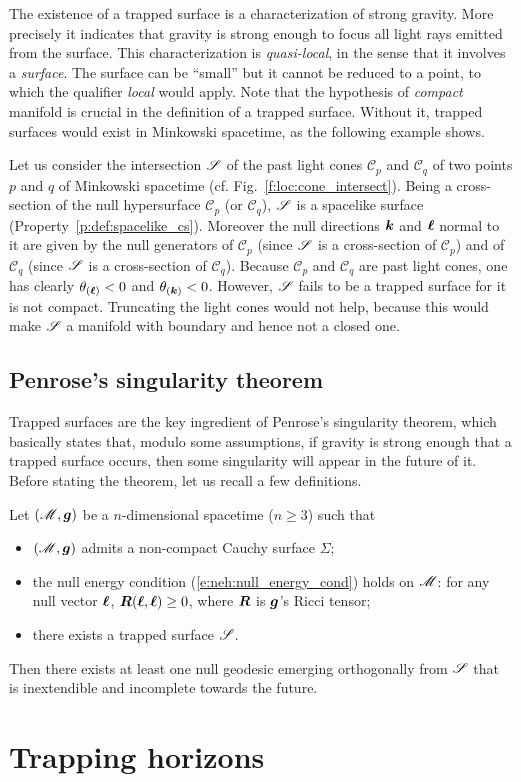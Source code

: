 The existence of a trapped surface is a characterization of
strong gravity. More precisely it indicates that gravity is strong enough
to focus all light rays emitted from the surface.
This characterization is \emph{quasi-local}, in the sense that it involves a \emph{surface}. The
surface can be ``small'' but it cannot be reduced to a point, to which the qualifier \emph{local}
would apply. Note that the hypothesis of \emph{compact} manifold is crucial in the definition of a
trapped surface. Without it, trapped surfaces would exist in Minkowski
spacetime, as the following example shows.

\begin{example}
Let us consider the intersection $\mathscr{S}$ of the past light cones $\mathscr{C}_p$ and $\mathscr{C}_q$
of two points $p$ and $q$ of Minkowski spacetime (cf. Fig.~\ref{f:loc:cone_intersect}).
Being a cross-section of the null hypersurface $\mathscr{C}_p$ (or $\mathscr{C}_q$),
$\mathscr{S}$ is a spacelike surface (Property~\ref{p:def:spacelike_cs}).
Moreover the null directions $\bm{k}$ and $\bm{\ell}$ normal to it are given by the null generators of
$\mathscr{C}_p$ (since $\mathscr{S}$ is a cross-section of $\mathscr{C}_p$)
and of $\mathscr{C}_q$ (since $\mathscr{S}$ is a cross-section of $\mathscr{C}_q$).
Because $\mathscr{C}_p$ and $\mathscr{C}_q$ are past light cones, one has clearly
$\theta_{(\bm{\ell})} < 0$ and $\theta_{(\bm{k})} < 0$.
However, $\mathscr{S}$ fails to be a trapped surface for it is not compact. Truncating the light cones
would not help, because this would make $\mathscr{S}$ a manifold with boundary and hence not a closed one.
\end{example}


\subsection{Penrose's singularity theorem}

Trapped surfaces are the key ingredient of Penrose's singularity theorem,
which basically states that, modulo some assumptions, if gravity is
strong enough that a trapped surface occurs, then some singularity will
appear in the future of it.
Before stating the theorem, let us recall a few definitions.


\begin{prop}
Let $(\mathscr{M},\bm{g})$ be a $n$-dimensional spacetime ($n\ge 3$) such that
\begin{itemize}
\item $(\mathscr{M},\bm{g})$ admits a non-compact Cauchy surface $\Sigma$;
\item the null energy condition (\ref{e:neh:null_energy_cond}) holds on $\mathscr{M}$:
for any null vector $\bm{\ell}$, $\bm{R}(\bm{\ell}, \bm{\ell}) \geq 0$, where $\bm{R}$ is
$\bm{g}$'s Ricci tensor;
\item there exists a trapped surface $\mathscr{S}$.
\end{itemize}
Then there exists at least one null geodesic emerging orthogonally from $\mathscr{S}$
that is inextendible and incomplete towards the future.
\end{prop}


\section{Trapping horizons}


